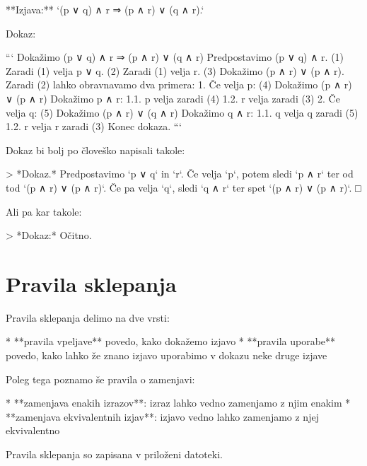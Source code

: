 **Izjava:** `(p ∨ q) ∧ r ⇒ (p ∧ r) ∨ (q ∧ r).`

Dokaz:

```
Dokažimo (p ∨ q) ∧ r ⇒ (p ∧ r) ∨ (q ∧ r)
  Predpostavimo (p ∨ q) ∧ r.                         (1)
  Zaradi (1) velja p ∨ q.                            (2)
  Zaradi (1) velja r.                                (3)
  Dokažimo (p ∧ r) ∨ (p ∧ r).
     Zaradi (2) lahko obravnavamo dva primera:
         1. Če velja p:                              (4)
             Dokažimo (p ∧ r) ∨ (p ∧ r)
                Dokažimo p ∧ r:
                     1.1. p velja zaradi (4)
                     1.2. r velja zaradi (3)
         2. Če velja q:                              (5)
             Dokažimo (p ∧ r) ∨ (q ∧ r)
                Dokažimo q ∧ r:
                     1.1. q velja q zaradi (5)
                     1.2. r velja r zaradi (3)
Konec dokaza.
```

Dokaz bi bolj po človeško napisali takole:

> *Dokaz.* Predpostavimo `p ∨ q` in `r`. Če velja `p`, potem sledi `p ∧ r` ter od tod `(p ∧ r) ∨ (p ∧ r)`. Če pa velja `q`, sledi `q ∧ r` ter spet `(p ∧ r) ∨ (p ∧ r)`. □

Ali pa kar takole:

> *Dokaz:* Očitno.

\section{Pravila sklepanja}

Pravila sklepanja delimo na dve vrsti:

* **pravila vpeljave** povedo, kako dokažemo izjavo
* **pravila uporabe** povedo, kako lahko že znano izjavo uporabimo v dokazu neke druge izjave

Poleg tega poznamo še pravila o zamenjavi:

* **zamenjava enakih izrazov**: izraz lahko vedno zamenjamo z njim enakim
* **zamenjava ekvivalentnih izjav**: izjavo vedno lahko zamenjamo z njej ekvivalentno

Pravila sklepanja so zapisana v priloženi datoteki.

